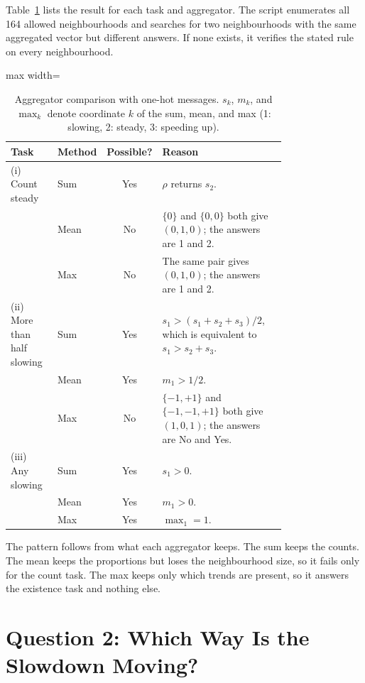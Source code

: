 \documentclass{article}
\begin{document}
Table~\ref{tab:q1c} lists the result for each task and aggregator. The script enumerates all 164 allowed neighbourhoods and searches for two neighbourhoods with the same aggregated vector but different answers. If none exists, it verifies the stated rule on every neighbourhood.

\begin{table}[htbp]
\centering
\caption{Aggregator comparison with one-hot messages. $s_k$, $m_k$, and $\max_k$ denote coordinate $k$ of the sum, mean, and max (1: slowing, 2: steady, 3: speeding up).}
\label{tab:q1c}
\footnotesize
\begin{adjustbox}{max width=\linewidth}
\begin{tabular}{>{\raggedright\arraybackslash}p{0.21\linewidth}lc>{\raggedright\arraybackslash}p{0.56\linewidth}}
\toprule
Task & Method & Possible? & Reason \\
\midrule
(i) Count steady & Sum & Yes & $\rho$ returns $s_2$. \\
 & Mean & No & $\{0\}$ and $\{0,0\}$ both give $(0,1,0)$; the answers are 1 and 2. \\
 & Max & No & The same pair gives $(0,1,0)$; the answers are 1 and 2. \\
\midrule
(ii) More than half slowing & Sum & Yes & $s_1>(s_1+s_2+s_3)/2$, which is equivalent to $s_1>s_2+s_3$. \\
 & Mean & Yes & $m_1>1/2$. \\
 & Max & No & $\{-1,+1\}$ and $\{-1,-1,+1\}$ both give $(1,0,1)$; the answers are No and Yes. \\
\midrule
(iii) Any slowing & Sum & Yes & $s_1>0$. \\
 & Mean & Yes & $m_1>0$. \\
 & Max & Yes & $\max_1=1$. \\
\bottomrule
\end{tabular}
\end{adjustbox}
\end{table}

The pattern follows from what each aggregator keeps. The sum keeps the counts. The mean keeps the proportions but loses the neighbourhood size, so it fails only for the count task. The max keeps only which trends are present, so it answers the existence task and nothing else.

\section{Question 2: Which Way Is the Slowdown Moving?}
\label{sec:q2}
\end{document}
